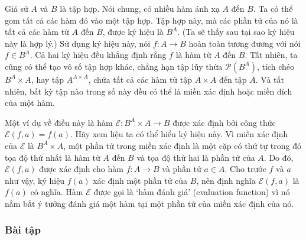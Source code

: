 Giả sử $A$ và $B$ là tập hợp. Nói chung, có nhiều hàm ánh xạ $A$ đến $B$. Ta có thể gom tất cả các hàm đó vào một tập hợp. Tập hợp này, mà các phần tử của nó là tất cả các hàm từ $A$ đến $B$, được ký hiệu là $B^A$. (Ta sẽ thấy sau tại sao ký hiệu này là hợp lý.) Sử dụng ký hiệu này, nói $f\colon A \to B$ hoàn toàn tương đương với nói $f \in B^A$. Cả hai ký hiệu đều khẳng định rằng $f$ là hàm từ $A$ đến $B$. Tất nhiên, ta cũng có thể tạo vô số tập hợp khác, chẳng hạn tập lũy thừa $\mathcal{P}(B^A)$, tích chéo $B^A \times A$, hay tập $A^{A \times A}$, chứa tất cả các hàm từ tập $A \times A$ đến tập $A$. Và tất nhiên, bất kỳ tập nào trong số này đều có thể là miền xác định hoặc miền đích của một hàm.

Một ví dụ về điều này là hàm $\mathcal{E}\colon B^A \times A \to B$ được xác định bởi công thức $\mathcal{E}(f,a) = f(a)$. Hãy xem liệu ta có thể hiểu ký hiệu này. Vì miền xác định của $\mathcal{E}$ là $B^A \times A$, một phần tử trong miền xác định là một cặp có thứ tự trong đó tọa độ thứ nhất là hàm từ $A$ đến $B$ và tọa độ thứ hai là phần tử của $A$. Do đó, $\mathcal{E}(f,a)$ được xác định cho hàm $f\colon A \to B$ và phần tử $a \in A$. Cho trước $f$ và $a$ như vậy, ký hiệu $f(a)$ xác định một phần tử của $B$, nên định nghĩa $\mathcal{E}(f,a)$ là $f(a)$ có nghĩa. Hàm $\mathcal{E}$ được gọi là `hàm đánh giá' (evaluation function) vì nó nắm bắt ý tưởng đánh giá một hàm tại một phần tử của miền xác định của nó.

\subsubsection*{Bài tập}

